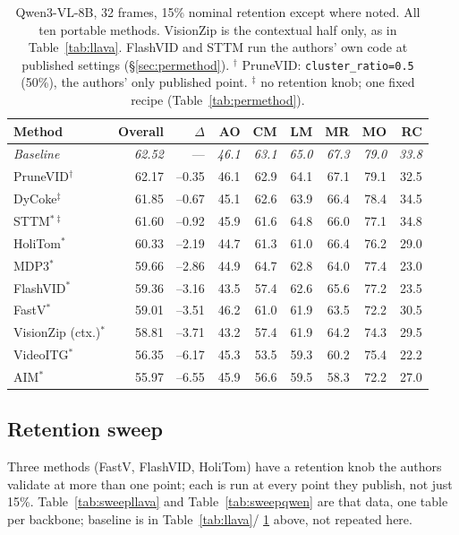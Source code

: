 \documentclass[11pt]{article}
\begin{document}
\begin{table}[H]
  \centering
  \small
  \caption{Qwen3-VL-8B, 32 frames, 15\% nominal retention except where
  noted. All ten portable methods. VisionZip is the contextual half only,
  as in Table~\ref{tab:llava}. FlashVID and STTM run the authors' own code
  at published settings (\S\ref{sec:permethod}). $^{\dagger}$ PruneVID:
  \texttt{cluster\_ratio=0.5} (50\%), the authors' only published point.
  $^{\ddagger}$ no retention knob; one fixed recipe (Table~\ref{tab:permethod}).}
  \label{tab:qwen}
  \begin{tabular}{lrrrrrrrr}
    \toprule
    Method & Overall & $\Delta$ & AO & CM & LM & MR & MO & RC \\
    \midrule
    \textit{Baseline} & \textit{62.52} & --- & \textit{46.1} & \textit{63.1} & \textit{65.0} & \textit{67.3} & \textit{79.0} & \textit{33.8} \\
    PruneVID$^{\dagger}$ & 62.17 & --0.35 & 46.1 & 62.9 & 64.1 & 67.1 & 79.1 & 32.5 \\
    DyCoke$^{\ddagger}$ & 61.85 & --0.67 & 45.1 & 62.6 & 63.9 & 66.4 & 78.4 & 34.5 \\
    STTM$^{*\ddagger}$ & 61.60 & --0.92 & 45.9 & 61.6 & 64.8 & 66.0 & 77.1 & 34.8 \\
    HoliTom$^{*}$ & 60.33 & --2.19 & 44.7 & 61.3 & 61.0 & 66.4 & 76.2 & 29.0 \\
    MDP3$^{*}$ & 59.66 & --2.86 & 44.9 & 64.7 & 62.8 & 64.0 & 77.4 & 23.0 \\
    FlashVID$^{*}$ & 59.36 & --3.16 & 43.5 & 57.4 & 62.6 & 65.6 & 77.2 & 23.5 \\
    FastV$^{*}$ & 59.01 & --3.51 & 46.2 & 61.0 & 61.9 & 63.5 & 72.2 & 30.5 \\
    VisionZip (ctx.)$^{*}$ & 58.81 & --3.71 & 43.2 & 57.4 & 61.9 & 64.2 & 74.3 & 29.5 \\
    VideoITG$^{*}$ & 56.35 & --6.17 & 45.3 & 53.5 & 59.3 & 60.2 & 75.4 & 22.2 \\
    AIM$^{*}$ & 55.97 & --6.55 & 45.9 & 56.6 & 59.5 & 58.3 & 72.2 & 27.0 \\
    \bottomrule
  \end{tabular}
\end{table}

\subsection{Retention sweep}
\label{sec:retentionsec}

Three methods (FastV, FlashVID, HoliTom) have a retention knob the authors
validate at more than one point; each is run at every point they publish,
not just 15\%. Table~\ref{tab:sweepllava} and Table~\ref{tab:sweepqwen} are
that data, one table per backbone; baseline is in Table~\ref{tab:llava}/
\ref{tab:qwen} above, not repeated here.
\end{document}
